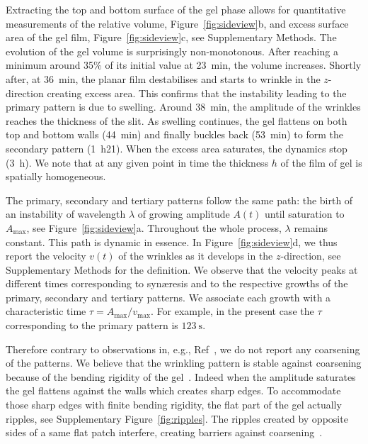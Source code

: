 \documentclass[twocolumn,superscriptaddress,showpacs,preprintnumbers,
amsmath,amssymb,prl]{revtex4-1}
\begin{document}
Extracting the top and bottom surface of the gel phase allows for quantitative measurements of the relative volume, Figure~\ref{fig:sideview}b, and excess surface area of the gel film, Figure~\ref{fig:sideview}c, see Supplementary Methods. The evolution of the gel volume is surprisingly non-monotonous. After reaching a minimum around 35\% of its initial value at \SI{23}{\minute}, the volume increases. Shortly after, at \SI{36}{\minute}, the planar film destabilises and starts to wrinkle in the $z$-direction creating excess area. This confirms that the instability leading to the primary pattern is due to swelling. Around \SI{38}{\minute}, the amplitude of the wrinkles reaches the thickness of the slit. As swelling continues, the gel flattens on both top and bottom walls (\SI{44}{\minute}) and finally buckles back (\SI{53}{\minute}) to form the secondary pattern (\SI{1}{\hour}21). When the excess area saturates, the dynamics stop (\SI{3}{\hour}). We note that at any given point in time the thickness $h$ of the film of gel is spatially homogeneous.

The primary, secondary and tertiary patterns follow the same path: the birth of an instability of wavelength $\lambda$ of growing amplitude $A(t)$ until saturation to $A_\text{max}$, see Figure~\ref{fig:sideview}a. Throughout the whole process, $\lambda$ remains constant. This path is dynamic in essence. In Figure~\ref{fig:sideview}d, we thus report the velocity $v(t)$ of the wrinkles as it develops in the $z$-direction, see Supplementary Methods for the definition. We observe that the velocity peaks at different times corresponding to syn\ae{}resis and to the respective growths of the primary, secondary and tertiary patterns. We associate each growth with a characteristic time $\tau = A_\text{max}/v_\text{max}$. For example, in the present case the $\tau$ corresponding to the primary pattern is $\SI{123}{\second}$.

Therefore contrary to observations in, e.g., Ref~\cite{Yoo2003}, we do not report any coarsening of the patterns. We believe that the wrinkling pattern is stable against coarsening because of the bending rigidity of the gel~\cite{LeGoff2014}. Indeed when the amplitude saturates the gel flattens against the walls which creates sharp edges. To accommodate those sharp edges with finite bending rigidity, the flat part of the gel actually ripples, see Supplementary Figure~\ref{fig:ripples}. The ripples created by opposite sides of a same flat patch interfere, creating barriers against coarsening~\cite{LeGoff2014}.
\end{document}
